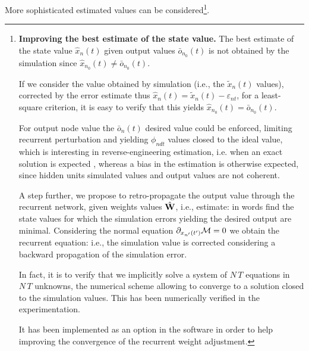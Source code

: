 More sophisticated estimated values can be considered\footnote{\label{improvingstate}{\bf Improving the best estimate of the state value.} The best estimate of the state value $\hat{x}_n(t)$ given output values $\bar{o}_{n_0}(t)$ is not obtained by the simulation since $\hat{x}_{n_0}(t) \neq \bar{o}_{n_0}(t)$.

If we consider the value obtained by simulation (i.e., the $\tilde{x}_n(t)$ values), corrected by the error estimate thus $\hat{x}_n(t) = \tilde{x}_n(t) - \varepsilon_{nt}$, for a least-square criterion, it is easy to verify that this yields $\hat{x}_{n_0}(t) = \bar{o}_{n_0}(t)$. 

For output node value the $\bar{o}_n(t)$ desired value could be enforced, limiting recurrent perturbation and yielding $\phi_{ndt}$ values closed to the ideal value, which is interesting in reverse-engineering estimation, i.e. when an exact solution is expected \cite{rostro-gonzalez-cessac-etal:10}, whereas a bias in the estimation is otherwise expected, since hidden units simulated values and output values are not coherent.

A step further, we propose to retro-propagate the output value through the recurrent network, given weights values $\hat{\bf W}$, i.e., estimate:
in words find the state values for which the simulation errors yielding the desired output are minimal. Considering the normal equation $\partial_{x_{n'}(t')} {\cal M} = 0$ we obtain the recurrent equation:
i.e., the simulation value is corrected considering a backward propagation of the simulation error.

In fact, it is to verify that we implicitly solve a system of $N\,T$ equations in $N\,T$ unknowns, the numerical scheme allowing to converge to a solution closed to the simulation values. This has been numerically verified in the experimentation.

It has been implemented as an option in the software in order to help improving the convergence of the recurrent weight adjustment. \hr}.

